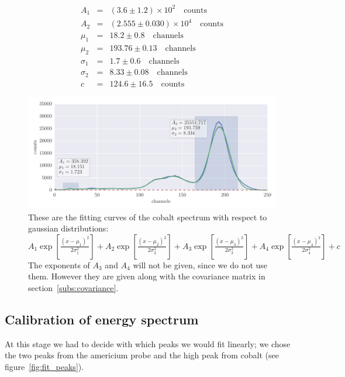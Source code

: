 \begin{align*}
    A_1 &=& \left(3.6 \pm 1.2\right) \times 10^{2} \quad \mathrm{counts}\\
    A_2 &=& \left(2.555 \pm 0.030\right) \times 10^{4} \quad \mathrm{counts}\\
    \mu_1 &=& 18.2 \pm 0.8 \quad \mathrm{channels}\\
    \mu_2 &=& 193.76 \pm 0.13 \quad \mathrm{channels}\\
    \sigma_1 &=& 1.7 \pm 0.6 \quad \mathrm{channels}\\
    \sigma_2 &=& 8.33 \pm 0.08 \quad \mathrm{channels}\\
    c &=& 124.6 \pm 16.5 \quad \mathrm{counts}
\end{align*}


\begin{figure}[htpb]
    \centering
    \includegraphics[width=1.1\linewidth]{analysis/figures/plot2_1a_reg}
    \caption{These are the fitting curves of the cobalt spectrum with respect to gaussian distributions:
        $A_1\exp{\left[\frac{(x-\mu_1)^2}{2 \sigma_1^2} \right]}+
         A_2\exp{\left[\frac{(x-\mu_2)^2}{2 \sigma_2^2} \right]}+
         A_3\exp{\left[\frac{(x-\mu_3)^2}{2 \sigma_3^2} \right]}+ 
         A_4\exp{\left[\frac{(x-\mu_4)^2}{2 \sigma_4^2} \right]}+ c$
         The exponents of $A_3$ and $A_4$ will not be given, since we do not use them. However they are given 
along with the covariance matrix in section~\ref{subs:covariance}.}
         \label{fig:fit2}
\end{figure}

\subsection{Calibration of energy spectrum}
At this stage we had to decide with which peaks we would fit linearly; we chose
the two peaks from the americium probe and the high peak from cobalt (see figure~\ref{fig:fit_peaks}).

